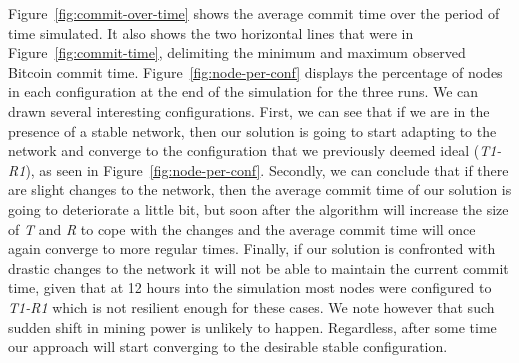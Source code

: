 Figure~\ref{fig:commit-over-time} shows the average commit time over the period of time simulated. It also shows the two horizontal lines that were in Figure~\ref{fig:commit-time}, delimiting the minimum and maximum observed Bitcoin commit time. Figure~\ref{fig:node-per-conf} displays the percentage of nodes in each configuration at the end of the simulation for the three runs.
We can drawn several interesting configurations.
First, we can see that if we are in the presence of a stable network, then our solution is going to start adapting to the network and converge to the configuration that we previously deemed ideal (\textsl{T1-R1}), as seen in Figure~\ref{fig:node-per-conf}. Secondly, we can conclude that if there are slight changes to the network, then the average commit time of our solution is going to deteriorate a little bit, but soon after the algorithm will increase the size of \textsl{T} and \textsl{R} to cope with the changes and the average commit time will once again converge to more regular times. Finally, if our solution is confronted with drastic changes to the network it will not be able to maintain the current commit time, given that at 12 hours into the simulation most nodes were configured to \textsl{T1-R1} which is not resilient enough for these cases.
We note however that such sudden shift in mining power is unlikely to happen.
Regardless, after some time our approach will start converging to the desirable stable configuration.
